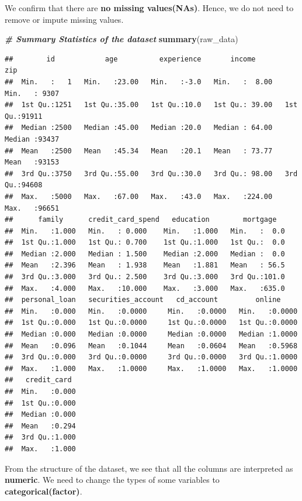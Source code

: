 \documentclass[
]{article}
\newenvironment{Shaded}{\begin{snugshade}}{\end{snugshade}}
\newcommand{\CommentTok}[1]{\textcolor[rgb]{0.00,0.40,1.00}{\textbf{\textit{#1}}}}
\newcommand{\KeywordTok}[1]{\textcolor[rgb]{0.26,0.66,0.93}{\textbf{#1}}}
\newcommand{\NormalTok}[1]{\textcolor[rgb]{0.74,0.68,0.62}{#1}}
\begin{document}
We confirm that there are \textbf{no missing values(NAs)}. Hence, we do
not need to remove or impute missing values.

\begin{Shaded}
\begin{Highlighting}[]
\CommentTok{# Summary Statistics of the dataset}
\KeywordTok{summary}\NormalTok{(raw_data)}
\end{Highlighting}
\end{Shaded}

\begin{verbatim}
##        id            age          experience       income            zip       
##  Min.   :   1   Min.   :23.00   Min.   :-3.0   Min.   :  8.00   Min.   : 9307  
##  1st Qu.:1251   1st Qu.:35.00   1st Qu.:10.0   1st Qu.: 39.00   1st Qu.:91911  
##  Median :2500   Median :45.00   Median :20.0   Median : 64.00   Median :93437  
##  Mean   :2500   Mean   :45.34   Mean   :20.1   Mean   : 73.77   Mean   :93153  
##  3rd Qu.:3750   3rd Qu.:55.00   3rd Qu.:30.0   3rd Qu.: 98.00   3rd Qu.:94608  
##  Max.   :5000   Max.   :67.00   Max.   :43.0   Max.   :224.00   Max.   :96651  
##      family      credit_card_spend   education        mortgage    
##  Min.   :1.000   Min.   : 0.000    Min.   :1.000   Min.   :  0.0  
##  1st Qu.:1.000   1st Qu.: 0.700    1st Qu.:1.000   1st Qu.:  0.0  
##  Median :2.000   Median : 1.500    Median :2.000   Median :  0.0  
##  Mean   :2.396   Mean   : 1.938    Mean   :1.881   Mean   : 56.5  
##  3rd Qu.:3.000   3rd Qu.: 2.500    3rd Qu.:3.000   3rd Qu.:101.0  
##  Max.   :4.000   Max.   :10.000    Max.   :3.000   Max.   :635.0  
##  personal_loan   securities_account   cd_account         online      
##  Min.   :0.000   Min.   :0.0000     Min.   :0.0000   Min.   :0.0000  
##  1st Qu.:0.000   1st Qu.:0.0000     1st Qu.:0.0000   1st Qu.:0.0000  
##  Median :0.000   Median :0.0000     Median :0.0000   Median :1.0000  
##  Mean   :0.096   Mean   :0.1044     Mean   :0.0604   Mean   :0.5968  
##  3rd Qu.:0.000   3rd Qu.:0.0000     3rd Qu.:0.0000   3rd Qu.:1.0000  
##  Max.   :1.000   Max.   :1.0000     Max.   :1.0000   Max.   :1.0000  
##   credit_card   
##  Min.   :0.000  
##  1st Qu.:0.000  
##  Median :0.000  
##  Mean   :0.294  
##  3rd Qu.:1.000  
##  Max.   :1.000
\end{verbatim}

From the structure of the dataset, we see that all the columns are
interpreted as \textbf{numeric}. We need to change the types of some
variables to \textbf{categorical(factor)}.
\end{document}
